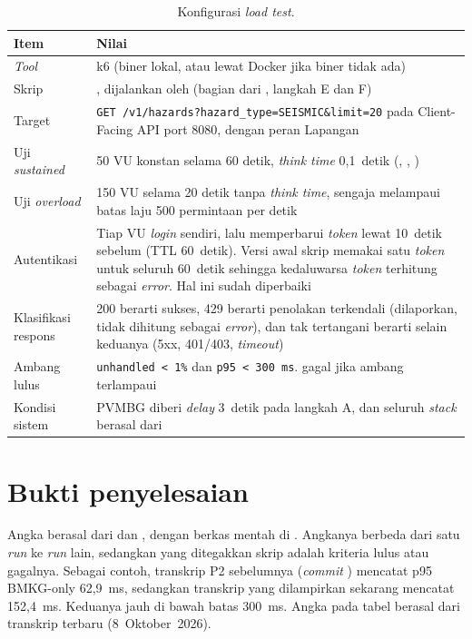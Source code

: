 \begin{table}[H]
\centering\small
\begin{tabularx}{\textwidth}{@{}L{3.2cm}Y@{}}
\toprule
\textbf{Item} & \textbf{Nilai}\\
\midrule
\emph{Tool} & k6 (biner lokal, atau  lewat Docker jika biner tidak ada)\\
Skrip & , dijalankan oleh  (bagian dari , langkah E dan F)\\
Target & \texttt{GET /v1/hazards?hazard\_type=SEISMIC\&limit=20} pada Client-Facing API port 8080, dengan peran Lapangan\\
Uji \emph{sustained} & 50 VU konstan selama 60 detik, \emph{think time} 0,1~detik (, , )\\
Uji \emph{overload} & 150 VU selama 20 detik tanpa \emph{think time}, sengaja melampaui batas laju 500 permintaan per detik\\
Autentikasi & Tiap VU \emph{login} sendiri, lalu memperbarui \emph{token} lewat  10~detik sebelum  (TTL 60~detik). Versi awal skrip memakai satu \emph{token} untuk seluruh 60~detik sehingga kedaluwarsa \emph{token} terhitung sebagai \emph{error}. Hal ini sudah diperbaiki\\
Klasifikasi respons & 200 berarti sukses, 429 berarti penolakan terkendali (dilaporkan, tidak dihitung sebagai \emph{error}), dan tak tertangani berarti selain keduanya (5xx, 401/403, \emph{timeout})\\
Ambang lulus & \texttt{unhandled < 1\%} dan \texttt{p95 < 300 ms}.  gagal jika ambang terlampaui\\
Kondisi sistem & PVMBG diberi \emph{delay} 3~detik pada langkah A, dan seluruh \emph{stack} berasal dari \\
\bottomrule
\end{tabularx}
\caption{Konfigurasi \emph{load test}.}
\end{table}

\section{Bukti penyelesaian}

Angka berasal dari  dan , dengan berkas mentah di
. Angkanya berbeda dari satu \emph{run} ke \emph{run} lain, sedangkan yang ditegakkan skrip adalah kriteria
lulus atau gagalnya. Sebagai contoh, transkrip P2 sebelumnya (\emph{commit} ) mencatat p95 BMKG-only 62,9~ms,
sedangkan transkrip yang dilampirkan sekarang mencatat 152,4~ms. Keduanya jauh di bawah batas 300~ms. Angka pada
tabel berasal dari transkrip terbaru (8~Oktober~2026).

